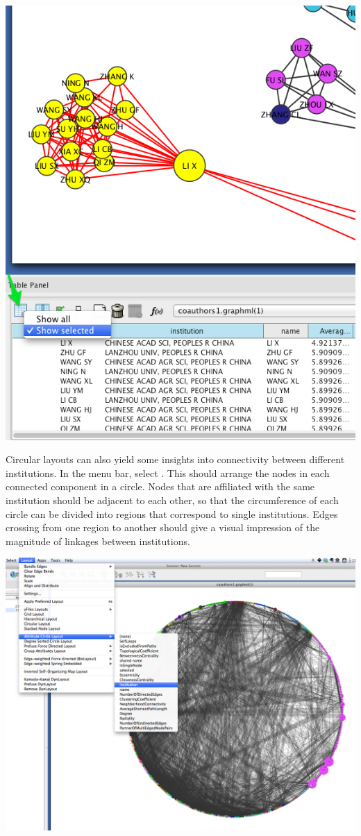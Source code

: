 \documentclass[letterpaper,10pt,english]{sphinxmanual}
\begin{document}
{\hfill\includegraphics{coauthors.19.png}\hfill}

Circular layouts can also yield some insights into connectivity between different
institutions. In the menu bar, select .
This should arrange the nodes in each connected component in a circle. Nodes that are
affiliated with the same institution should be adjacent to each other, so that the
circumference of each circle can be divided into regions that correspond to single
institutions. Edges crossing from one region to another should give a visual impression of
the magnitude of linkages between institutions.

{\hfill\includegraphics{coauthors.20.png}\hfill}
\end{document}
